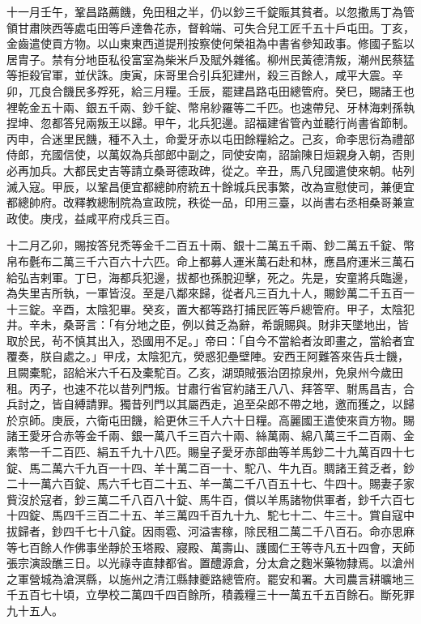 \begin{pinyinscope}
 十一月壬午，鞏昌路薦饑，免田租之半，仍以鈔三千錠賑其貧者。以忽撒馬丁為管領甘肅陜西等處屯田等戶達魯花赤，督斡端、可失合兒工匠千五十戶屯田。丁亥，金齒遣使貢方物。以山東東西道提刑按察使何榮祖為中書省參知政事。修國子監以居胄子。禁有分地臣私役富室為柴米戶及賦外雜徭。柳州民黃德清叛，潮州民蔡猛等拒殺官軍，並伏誅。庚寅，床哥里合引兵犯建州，殺三百餘人，咸平大震。辛卯，兀良合饑民多殍死，給三月糧。壬辰，罷建昌路屯田總管府。癸巳，賜諸王也裡乾金五十兩、銀五千兩、鈔千錠、幣帛紗羅等二千匹。也速帶兒、牙林海剌孫執捏坤、忽都答兒兩叛王以歸。甲午，北兵犯邊。詔福建省管內並聽行尚書省節制。丙申，合迷里民饑，種不入土，命愛牙赤以屯田餘糧給之。己亥，命李思衍為禮部侍郎，充國信使，以萬奴為兵部郎中副之，同使安南，詔諭陳日烜親身入朝，否則必再加兵。大都民史吉等請立桑哥德政碑，從之。辛丑，馬八兒國遣使來朝。帖列滅入寇。甲辰，以鞏昌便宜都總帥府統五十餘城兵民事繁，改為宣慰使司，兼便宜都總帥府。改釋教總制院為宣政院，秩從一品，印用三臺，以尚書右丞相桑哥兼宣政使。庚戌，益咸平府戍兵三百。



 十二月乙卯，賜按答兒禿等金千二百五十兩、銀十二萬五千兩、鈔二萬五千錠、幣帛布氎布二萬三千六百六十六匹。命上都募人運米萬石赴和林，應昌府運米三萬石給弘吉剌軍。丁巳，海都兵犯邊，拔都也孫脫迎擊，死之。先是，安童將兵臨邊，為失里吉所執，一軍皆沒。至是八鄰來歸，從者凡三百九十人，賜鈔萬二千五百一十三錠。辛酉，太陰犯畢。癸亥，置大都等路打捕民匠等戶總管府。甲子，太陰犯井。辛未，桑哥言：「有分地之臣，例以貧乏為辭，希覬賜與。財非天墜地出，皆取於民，茍不慎其出入，恐國用不足。」帝曰：「自今不當給者汝即畫之，當給者宜覆奏，朕自處之。」甲戌，太陰犯亢，熒惑犯壘壁陣。安西王阿難答來告兵士饑，且闕橐駝，詔給米六千石及橐駝百。乙亥，湖頭賊張治囝掠泉州，免泉州今歲田租。丙子，也速不花以昔列門叛。甘肅行省官約諸王八八、拜答罕、駙馬昌吉，合兵討之，皆自縛請罪。獨昔列門以其屬西走，追至朵郎不帶之地，邀而獲之，以歸於京師。庚辰，六衛屯田饑，給更休三千人六十日糧。高麗國王遣使來貢方物。賜諸王愛牙合赤等金千兩、銀一萬八千三百六十兩、絲萬兩、綿八萬三千二百兩、金素幣一千二百匹、絹五千九十八匹。賜皇子愛牙赤部曲等羊馬鈔二十九萬百四十七錠、馬二萬六千九百一十四、羊十萬二百一十、駝八、牛九百。賙諸王貧乏者，鈔二十一萬六百錠、馬六千七百二十五、羊一萬二千八百五十七、牛四十。賜妻子家貲沒於寇者，鈔三萬二千八百八十錠、馬牛百，償以羊馬諸物供軍者，鈔千六百七十四錠、馬四千三百二十五、羊三萬四千百九十九、駝七十二、牛三十。賞自寇中拔歸者，鈔四千七十八錠。因雨雹、河溢害稼，除民租二萬二千八百石。命亦思麻等七百餘人作佛事坐靜於玉塔殿、寢殿、萬壽山、護國仁王等寺凡五十四會，天師張宗演設醮三日。以光祿寺直隸都省。置醴源倉，分太倉之麴米藥物隸焉。以滄州之軍營城為滄溟縣，以施州之清江縣隸夔路總管府。罷安和署。大司農言耕曠地三千五百七十頃，立學校二萬四千四百餘所，積義糧三十一萬五千五百餘石。斷死罪九十五人。




\end{pinyinscope}
